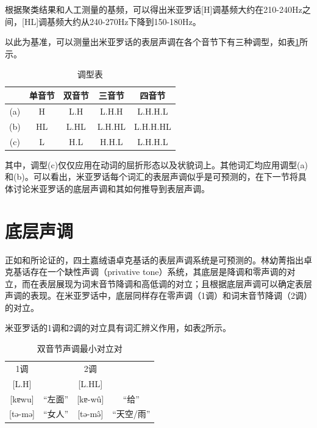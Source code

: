 根据聚类结果和人工测量的基频，可以得出米亚罗话[H]调基频大约在210-240Hz之间，[HL]调基频大约从240-270Hz下降到150-180Hz。

以此为基准，可以测量出米亚罗话的表层声调在各个音节下有三种调型，如表\ref{to}所示。

\begin{table}[H]
    \vspace{5pt}
    \centering
    \caption{调型表}
    \label{to}
\begin{tabular}{c|cccc}
   \toprule
    & 单音节 & 双音节  & 三音节    & 四音节      \\
    \midrule
  (a) & H   & L.H  & L.H.H  & L.H.H.L  \\
(b) & HL  & L.HL & L.H.HL & L.H.H.HL \\
(c) & L   & H.L  & H.H.L  & L.H.H.L \\
   \bottomrule
\end{tabular}
\end{table}

其中，调型(c)仅仅应用在动词的屈折形态以及状貌词上。其他词汇均应用调型(a)和(b)。可以看出，米亚罗话每个词汇的表层声调似乎是可预测的，在下一节将具体讨论米亚罗话的底层声调和其如何推导到表层声调。

\section{底层声调}

正如\textcite{hsieh1999theoretical}和\textcite{lin2012no}所论证的，四土嘉绒语卓克基话的表层声调系统是可预测的。林幼菁指出卓克基话存在一个缺性声调（privative tone）系统，其底层是降调和零声调的对立，而在表层展现为词末音节降调和高低调的对立；且根据底层声调可以确定表层声调的表现。在米亚罗话中，底层同样存在零声调（1调）和词末音节降调（2调）的对立。

米亚罗话的1调和2调的对立具有词汇辨义作用，如表\ref{tonex}所示。

\begin{table}[H]
    \vspace{5pt}
    \centering
    \caption{双音节声调最小对立对}
    \label{tonex}
\begin{tabular}{cc|cc}
   \toprule
    1调 &  & 2调 & \\
    {[L.H]} & & [L.HL] & \\
    \midrule
  {[kɐwu]} & “左面” &  [kɐ-wû] & “给” \\
   {[tə-mə]} & “女人” & [tə-mə̂] & “天空/雨” \\
   \bottomrule
\end{tabular}
\end{table}

